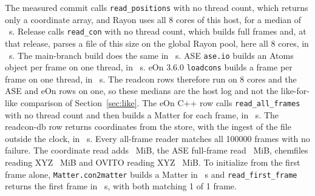 \documentclass[preprint,12pt]{elsarticle}
\begin{document}
The measured commit calls \texttt{read\_positions} with no thread count, which returns only a coordinate array, and Rayon uses all 8 cores of this host, for a median of \rcTipMedian~s.
Release \rcReleaseVersion{} calls \texttt{read\_con} with no thread count, which builds full frames and, at that release, parses a file of this size on the global Rayon pool, here all 8 cores, in \rcReleaseMedian~s.
The main-branch build does the same in \rcBaseMedian~s.
ASE \texttt{ase.io} builds an Atoms object per frame on one thread, in \rcAseMedian~s.
eOn 3.6.0 \texttt{loadcons} builds a frame per frame on one thread, in \rcEonMedian~s.
The readcon rows therefore run on 8 cores and the ASE and eOn rows on one, so these medians are the host log and not the like-for-like comparison of Section~\ref{sec:like}.
The eOn C++ row calls \texttt{read\_all\_frames} with no thread count and then builds a Matter for each frame, in \rcApiMedian~s.
The readcon-db row returns coordinates from the store, with the ingest of the file outside the clock, in \rcDbMedian~s.
Every all-frame reader matches all 100000 frames with no failure.
The coordinate read adds \rcTipMib~MiB, the ASE full-frame read \rcAseMib~MiB, chemfiles reading XYZ \rcChemMib~MiB and OVITO reading XYZ \rcOvitoMib~MiB.
To initialize from the first frame alone, \texttt{Matter.con2matter} builds a Matter in \rcMatterMedian~s and \texttt{read\_first\_frame} returns the first frame in \rcFirstMedian~s, with both matching 1 of 1 frame.


\end{document}
